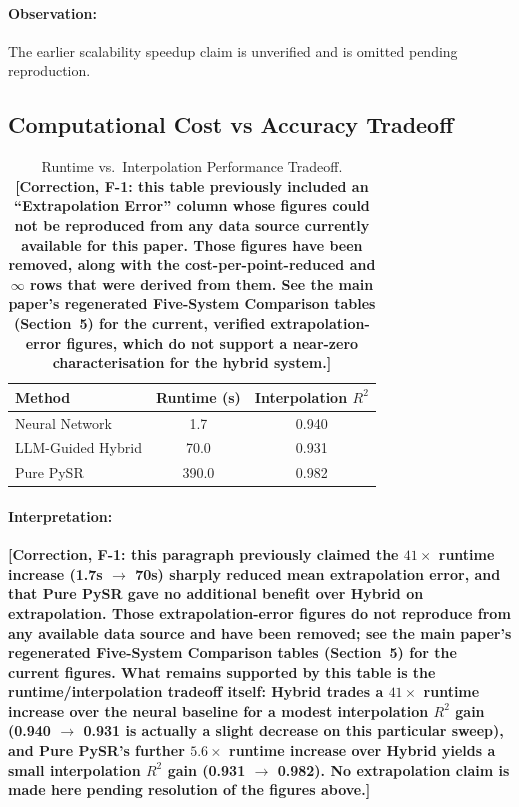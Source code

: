 \documentclass[twoside,11pt]{article}
\begin{document}
\paragraph{Observation:} The earlier scalability speedup claim is unverified and is omitted pending reproduction.

\subsection{Computational Cost vs Accuracy Tradeoff}

\begin{table}[H]
\centering
\caption{Runtime vs.\ Interpolation Performance Tradeoff. \textbf{[Correction,
  F-1: this table previously included an ``Extrapolation Error'' column
  whose figures could not be reproduced from any data source currently
  available for this paper. Those figures have been removed, along with the
  cost-per-point-reduced and $\infty$ rows that were derived from them. See
  the main paper's regenerated Five-System Comparison tables (Section~5)
  for the current, verified extrapolation-error figures, which do not
  support a near-zero characterisation for the hybrid system.]}}
\label{tab:cost_accuracy_tradeoff}
\begin{tabular}{lcc}
\toprule
\textbf{Method} & \textbf{Runtime (s)} & \textbf{Interpolation $R^2$} \\
\midrule
Neural Network & 1.7 & 0.940 \\
LLM-Guided Hybrid & 70.0 & 0.931 \\
Pure PySR & 390.0 & 0.982 \\
\bottomrule
\end{tabular}
\end{table}

\paragraph{Interpretation:} \textbf{[Correction, F-1: this paragraph
previously claimed the $41\times$ runtime increase (1.7s $\to$ 70s) sharply
reduced mean extrapolation error, and that Pure PySR gave no additional
benefit over Hybrid on extrapolation. Those extrapolation-error figures do
not reproduce from any available data source and have been removed; see
the main paper's regenerated Five-System Comparison tables (Section~5) for
the current figures. What remains supported by this
table is the runtime/interpolation tradeoff itself: Hybrid trades a
$41\times$ runtime increase over the neural baseline for a modest
interpolation $R^2$ gain (0.940 $\to$ 0.931 is actually a slight decrease
on this particular sweep), and Pure PySR's further $5.6\times$ runtime
increase over Hybrid yields a small interpolation $R^2$ gain (0.931 $\to$
0.982). No extrapolation claim is made here pending resolution of the
figures above.]}
\end{document}
